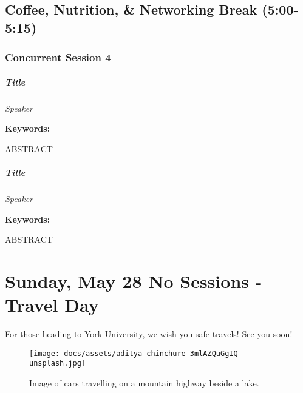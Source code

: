 \documentclass[
]{book}
\begin{document}
\hypertarget{coffee-nutrition-networking-break-500-515}{%
\section*{Coffee, Nutrition, \& Networking Break (5:00-5:15)}\label{coffee-nutrition-networking-break-500-515}}

\hypertarget{concurrent-session-4}{%
\subsection*{Concurrent Session 4}\label{concurrent-session-4}}

\begin{speaker}
\hypertarget{title}{%
\paragraph{\texorpdfstring{\textbf{Title}}{Title}}\label{title}}

\emph{Speaker}

\textbf{Keywords:}

ABSTRACT
\end{speaker}
\begin{speaker}
\hypertarget{title}{%
\paragraph{\texorpdfstring{\textbf{Title}}{Title}}\label{title}}

\emph{Speaker}

\textbf{Keywords:}

ABSTRACT
\end{speaker}

\hypertarget{sunday-may-28-no-sessions---travel-day}{%
\chapter{Sunday, May 28 \textbar{} No Sessions - Travel Day}\label{sunday-may-28-no-sessions---travel-day}}

For those heading to York University, we wish you safe travels! See you soon!

\begin{figure}
\centering
\texttt{[image: docs/assets/aditya-chinchure-3mlAZQuGgIQ-unsplash.jpg]}
\caption{Image of cars travelling on a mountain highway beside a lake.}
\end{figure}
\end{document}
